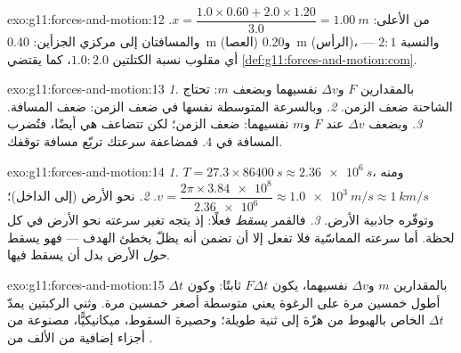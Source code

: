 \begin{solution}{exo:g11:forces-and-motion:12}
من الأعلى: $x = \dfrac{1.0 \times 0.60 + 2.0 \times 1.20}{3.0}
= \qty{1.00}{m}$. والمسافتان إلى مركزي الجزأين: \qty{0.40}{m}
(العصا) و\qty{0.20}{m} (الرأس)، والنسبة $2 : 1$ --- أي مقلوب
نسبة الكتلتين $1.0 : 2.0$، كما يقتضي \cref{def:g11:forces-and-motion:com}.
\end{solution}

\begin{solution}{exo:g11:forces-and-motion:13}
\emph{1.} بالمقدارين $F$ و$\Delta v$ نفسيهما وبضعف $m$: تحتاج الشاحنة ضعف
الزمن. \emph{2.} وبالسرعة المتوسطة نفسها في ضعف الزمن: ضعف
المسافة. \emph{3.} وبضعف $\Delta v$ عند $F$ و$m$ نفسيهما: ضعف
الزمن؛ لكن  تتضاعف هي أيضًا، فتُضرب المسافة
في $4$. فمضاعفة سرعتك تربّع مسافة
توقفك.
\end{solution}

\begin{solution}{exo:g11:forces-and-motion:14}
\emph{1.} $T = 27.3 \times \qty{86400}{s} \approx \qty{2.36e6}{s}$، ومنه
$v = \dfrac{2\pi \times \num{3.84e8}}{\num{2.36e6}} \approx
\qty{1.0e3}{m/s} \approx \qty{1}{km/s}$. \emph{2.} نحو الأرض
(إلى الداخل)؛ وتوفّره جاذبية الأرض. \emph{3.} فالقمر \emph{يسقط}
فعلًا: إذ يتجه تغير سرعته نحو الأرض في كل لحظة. أما
سرعته المماسّية فلا تفعل إلا أن تضمن أنه يظلّ يخطئ الهدف --- فهو يسقط
\emph{حول} الأرض بدل أن يسقط فيها.
\end{solution}

\begin{solution}{exo:g11:forces-and-motion:15}
بالمقدارين $m$ و$\Delta v$ نفسيهما، يكون $F\Delta t$ ثابتًا: وكون $\Delta t$ أطول خمسين
مرة على الرغوة يعني  متوسطة أصغر خمسين مرة.
وثني الركبتين يمدّ $\Delta t$ الخاص بالهبوط من هزّة إلى
ثنية طويلة؛ وحصيرة السقوط، ميكانيكيًّا، مصنوعة من أجزاء إضافية من
الألف من .
\end{solution}

